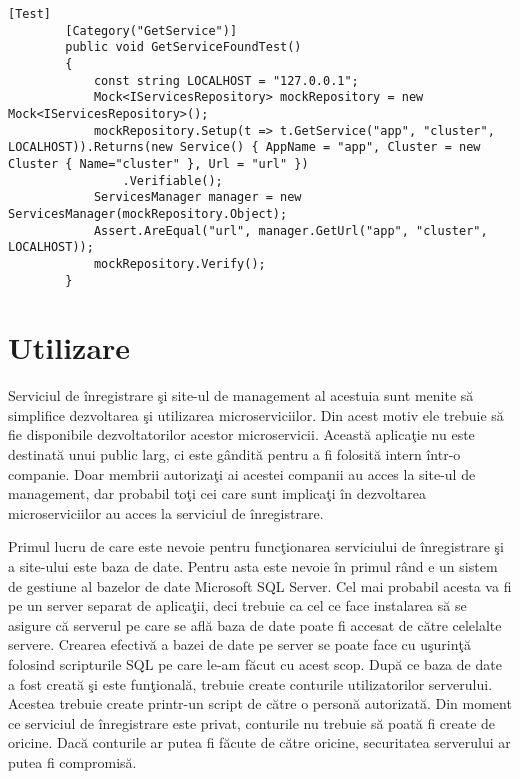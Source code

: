 \documentclass[a4paper,12pt]{report}
\begin{document}
\begin{lstlisting}[caption={Testul pentru metoda },label={lst:GetServiceTest},breaklines]
    [Test]
        [Category("GetService")]
        public void GetServiceFoundTest()
        {
			const string LOCALHOST = "127.0.0.1";
            Mock<IServicesRepository> mockRepository = new Mock<IServicesRepository>();
            mockRepository.Setup(t => t.GetService("app", "cluster", LOCALHOST)).Returns(new Service() { AppName = "app", Cluster = new Cluster { Name="cluster" }, Url = "url" })
                .Verifiable();
            ServicesManager manager = new ServicesManager(mockRepository.Object);
            Assert.AreEqual("url", manager.GetUrl("app", "cluster", LOCALHOST));
            mockRepository.Verify();
        }
\end{lstlisting}


\chapter{Utilizare}

Serviciul de \^inregistrare \c si site-ul de management al acestuia sunt menite s\u a simplifice dezvoltarea 
\c si utilizarea microserviciilor. Din acest motiv ele trebuie s\u a fie disponibile dezvoltatorilor acestor 
microservicii. Aceast\u a aplica\c tie nu este destinat\u a unui public larg, ci este g\^andit\u a pentru a fi folosit\u a
intern \^intr-o companie. Doar membrii autoriza\c ti ai acestei companii au acces la site-ul de management, dar 
probabil to\c ti cei care sunt implica\c ti \^in dezvoltarea microserviciilor au acces la serviciul de \^inregistrare.

Primul lucru de care este nevoie pentru func\c tionarea serviciului de \^inregistrare \c si a site-ului este baza de date.
Pentru asta este nevoie \^in primul r\^and e un sistem de gestiune al bazelor de date Microsoft SQL Server.
Cel mai probabil acesta va fi pe un server separat de aplica\c tii, deci trebuie ca cel ce face instalarea 
s\u a se asigure c\u a serverul pe care se afl\u a baza de date poate fi accesat de c\u atre celelalte servere.
Crearea efectiv\u a a bazei de date pe server se poate face cu u\c surin\c t\u a folosind scripturile SQL pe care le-am
f\u acut cu acest scop. Dup\u a ce baza de date a fost creat\u a \c si este fun\c tional\u a, trebuie create conturile 
utilizatorilor serverului. Acestea trebuie create printr-un script de c\u atre o person\u a autorizat\u a.
Din moment ce serviciul de \^inregistrare este privat, conturile nu trebuie s\u a poat\u a fi create de oricine.
Dac\u a conturile ar putea fi f\u acute de c\u atre oricine, securitatea serverului ar putea fi compromis\u a.
 
\end{document}

